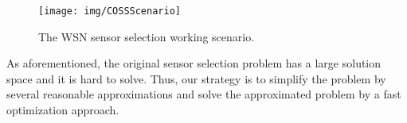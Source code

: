 \begin{figure*}
\centering
\texttt{[image: img/COSSScenario]}
\caption{The WSN sensor selection working scenario.\label{f:scenario}}
\end{figure*}

    As aforementioned, the original sensor selection problem has a large solution space and it is hard to solve. Thus, our strategy is to simplify the problem by several reasonable approximations and solve the approximated problem by a fast optimization approach.


